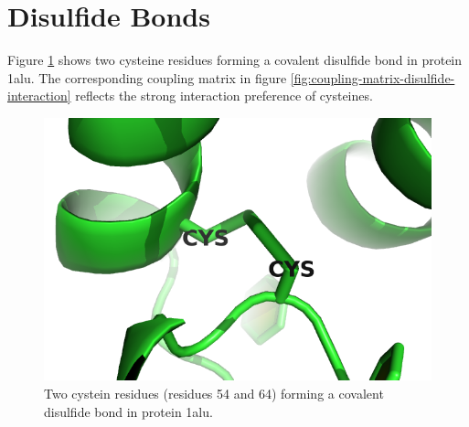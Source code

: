 \documentclass[12pt,a4paper,twoside]{book}
\theoremstyle{definition}
\theoremstyle{definition}
\theoremstyle{remark}
\begin{document}
\section{Disulfide Bonds}\label{disulfide}

Figure \ref{fig:coupling-matrix-disulfide-pymol} shows two cysteine
residues forming a covalent disulfide bond in protein 1alu. The
corresponding coupling matrix in figure
\ref{fig:coupling-matrix-disulfide-interaction} reflects the strong
interaction preference of cysteines.




\begin{figure}
\includegraphics[width=0.5\linewidth]{img/coupling_matrix_analysis/1aluA00_54_64} \caption{Two cystein residues
(residues 54 and 64) forming a covalent disulfide bond in protein 1alu.}\label{fig:coupling-matrix-disulfide-pymol}
\end{figure}
\end{document}
